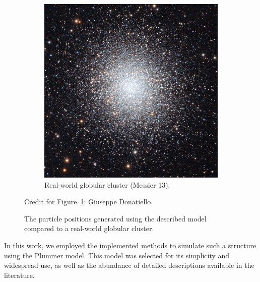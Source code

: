 \begin{figure}[!ht]
\begin{subfigure}[t]{0.4\textwidth}
        \includegraphics[width=\textwidth]{chapters/test-models/img/glob_cluster_m13.jpg}
        \caption{Real-world globular cluster (Messier 13).}
        \label{fig:messier-13}
    \end{subfigure}

    \vspace{0.5em}
    {\footnotesize
        Credit for Figure~\ref{fig:messier-13}: Giuseppe Donatiello. \par}

    \caption{The particle positions generated using the described model compared to a real-world globular cluster.}
    \label{fig:globular-cluster-gen-vs-real}
\end{figure}
In this work, we employed the implemented methods to simulate such a structure using the Plummer model.
This model was selected for its simplicity and widespread use, as well as the abundance of detailed descriptions available in the literature.

